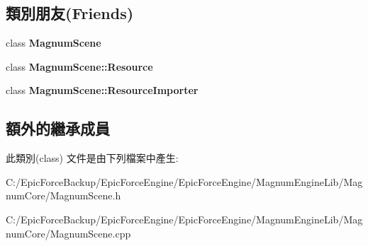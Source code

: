 \subsection*{類別朋友(Friends)}
\begin{DoxyCompactItemize}
\item 
class {\bfseries Magnum\+Scene}\hypertarget{class_magnum_1_1_magnum_scene_1_1_resource_importer_a0f518a37dee4252bc83e1953ecf3e240}{}\label{class_magnum_1_1_magnum_scene_1_1_resource_importer_a0f518a37dee4252bc83e1953ecf3e240}

\item 
class {\bfseries Magnum\+Scene\+::\+Resource}\hypertarget{class_magnum_1_1_magnum_scene_1_1_resource_importer_ad6ab972c70e10994a4dc5940fd732571}{}\label{class_magnum_1_1_magnum_scene_1_1_resource_importer_ad6ab972c70e10994a4dc5940fd732571}

\item 
class {\bfseries Magnum\+Scene\+::\+Resource\+Importer}\hypertarget{class_magnum_1_1_magnum_scene_1_1_resource_importer_a2a9515b539dbf6a1c27e41cbdc8d4ced}{}\label{class_magnum_1_1_magnum_scene_1_1_resource_importer_a2a9515b539dbf6a1c27e41cbdc8d4ced}

\end{DoxyCompactItemize}
\subsection*{額外的繼承成員}


此類別(class) 文件是由下列檔案中產生\+:\begin{DoxyCompactItemize}
\item 
C\+:/\+Epic\+Force\+Backup/\+Epic\+Force\+Engine/\+Epic\+Force\+Engine/\+Magnum\+Engine\+Lib/\+Magnum\+Core/Magnum\+Scene.\+h\item 
C\+:/\+Epic\+Force\+Backup/\+Epic\+Force\+Engine/\+Epic\+Force\+Engine/\+Magnum\+Engine\+Lib/\+Magnum\+Core/Magnum\+Scene.\+cpp\end{DoxyCompactItemize}
